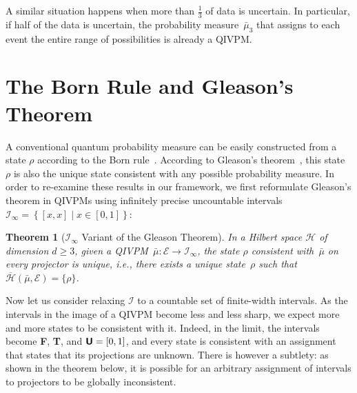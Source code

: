 \documentclass[english,reprint, aps, prl,superscriptaddress, showpacs,
showkeys, longbibliography, amsmath, amssymb, floatfix]{revtex4-1}
\theoremstyle{plain}
\newtheorem{thm}{Theorem}
\theoremstyle{definition}
\newcommand{\Hilb}{\mathcal{H}}
\newcommand{\events}{\ensuremath{\mathcal{E}}}
\newcommand{\imposs}{\textbf{\textsf{F}}}
\newcommand{\necess}{\textbf{\textsf{T}}}
\newcommand{\unknown}{\textbf{\textsf{U}}}
\newcommand{\set}[2]{\ensuremath{\left\{ {#1}\mathrel{}\middle|\mathrel{}{#2}\right\} }}
\newcommand{\coreBorn}{\ensuremath{\overline{\Hilb}}}
\begin{document}
A similar situation happens when more than $\frac{1}{3}$ of data
is uncertain. In particular, if half of the data is uncertain, the probability
measure~$\bar{\mu}_{3}$ that assigns to each event the entire range of possibilities
is already a QIVPM.

\section{The Born Rule and Gleason's Theorem}

\label{sec:Gleason}

A conventional quantum probability measure can be easily constructed
from a state $\rho$ according to the Born
rule~\cite{Born1983bibTeX,Mermin2007,Jaeger2007}.  According
to Gleason's
theorem~\cite{gleason1957,Redhead1987-REDINA,peres1995quantum}, this
state $\rho$ is also the unique state consistent with any possible
probability measure. In order to re-examine these results in our
framework, we first reformulate Gleason's theorem in QIVPMs using
infinitely precise uncountable
intervals~$\mathscr{I}_{\infty}=\set{\left[x,x\right]}{x\in\left[0,1\right]}$:

\begin{thm}[$\mathscr{I}_{\infty}$ Variant of the Gleason
  Theorem]\label{cor:Gleason's}In
  a Hilbert space $\Hilb$ of dimension $d\geq3$, given a
  QIVPM~$\bar{\mu}:\events\rightarrow\mathscr{I}_{\infty}$, the state
  $\rho$ consistent with~$\bar{\mu}$ on every projector
  is unique, i.e., there exists a
  unique state~$\rho$ such that
  $\coreBorn\left(\bar{\mu},\events\right)=\{\rho\}$.
  \end{thm}

Now let us consider relaxing $\mathscr{I}$
to a countable set of finite-width intervals.
As the intervals in the image of a QIVPM become less and less sharp,
we expect more and more states to be consistent with it. Indeed, in
the limit, the intervals become \imposs, \necess, and $\unknown=\left[0,1\right]$,  and
every state is consistent with an assignment that states that its
projections are unknown. There is however a subtlety: as shown in the
theorem below, it is possible for an arbitrary assignment of intervals to projectors
to be globally inconsistent.

\end{document}
